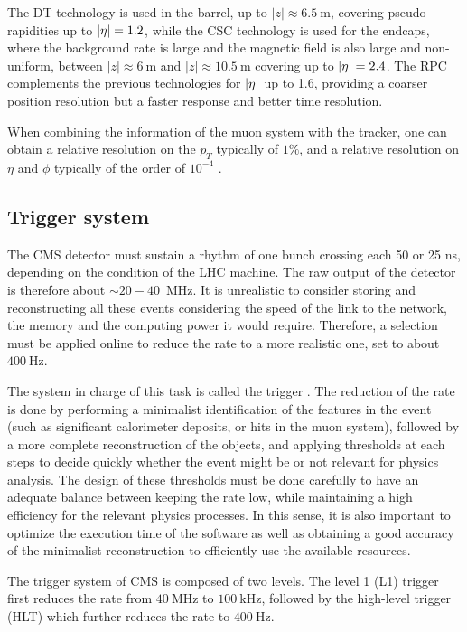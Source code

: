     The DT technology is used in the barrel, up to $\left|z\right| \approx 6.5~\text{m}$, covering
    pseudo-rapidities up to $\left| \eta \right| = 1.2$, while the CSC technology is used for the endcaps,
    where the background rate is large and the magnetic field is also large and non-uniform,
    between $\left|z\right| \approx 6~\text{m}$ and $\left|z\right| \approx 10.5~\text{m}$
    covering up to $\left| \eta \right| = 2.4$. The RPC complements the previous technologies for
    $\left| \eta \right|$ up to 1.6, providing a coarser position resolution but a faster response
    and better time resolution.

    When combining the information of the muon system with the tracker, one can
    obtain a relative resolution on the $p_T$ typically of $1\%$, and a relative
    resolution on $\eta$ and $\phi$ typically of the order of $10^{-4}$ \cite{CMStracking}.

    \subsection{Trigger system}

    The CMS detector must sustain a rhythm of one bunch crossing each 50 or 25 ns, depending
    on the condition of the LHC machine. The raw output of the detector is therefore
    about $\sim 20-40$~MHz. It is unrealistic to consider storing and reconstructing all these events
    considering the speed of the link to the network, the memory and the computing power
    it would require. Therefore, a selection must be applied online to reduce the rate
    to a more realistic one, set to about $400~$Hz.

    The system in charge of this task is called the trigger \cite{CMStrigger}. The reduction of the rate
    is done by performing a minimalist identification of the features in the event (such
    as significant calorimeter deposits, or hits in the muon system), followed by a more
    complete reconstruction of the objects, and applying thresholds at each steps to
    decide quickly whether the event might be or not relevant for physics analysis.
    The design of these thresholds must be done carefully to have an adequate balance
    between keeping the rate low, while maintaining a high efficiency for the relevant
    physics processes. In this sense, it is also important to optimize the execution
    time of the software as well as obtaining a good accuracy of the minimalist
    reconstruction to efficiently use the available resources.

    The trigger system of CMS is composed of two levels. The level 1 (L1) trigger first
    reduces the rate from $40~$MHz to $100~$kHz, followed by the high-level trigger (HLT)
    which further reduces the rate to $400~$Hz.

